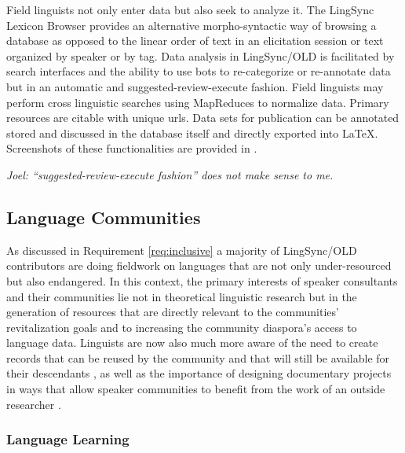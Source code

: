 \documentclass[11pt]{article}
\begin{document}
Field linguists not only enter data but also seek to analyze it. The LingSync
Lexicon Browser provides an alternative morpho-syntactic way of browsing a
database as opposed to the linear order of text in an elicitation session or
text organized by speaker or by tag. Data analysis in LingSync/OLD is
facilitated by search interfaces and the ability to use bots to re-categorize
or re-annotate data but in an automatic and suggested-review-execute fashion.
Field linguists may perform cross linguistic searches using MapReduces to
normalize data. Primary resources are citable with unique \glspl{url}. Data
sets for publication can be annotated stored and discussed in the database
itself and directly exported into LaTeX. Screenshots of these functionalities
are provided in \cite{lingsync:2012}.

\textit{Joel: ``suggested-review-execute fashion'' does not make sense to me.}

%
\subsection{Language Communities}

As discussed in Requirement \autoref{req:inclusive} a majority of LingSync/OLD contributors are doing fieldwork on languages that
are not only under-resourced but also endangered. In this context, the primary
interests of speaker consultants and their communities lie not in theoretical
linguistic research but in the generation of resources that are directly
relevant to the communities' revitalization goals and to increasing the community diaspora's
access to language data. Linguists are now also much more aware of the need to
create records that can be reused by the community and that will still be
available for their descendants \cite[p.129]{Thieberger:2012}, as well as the
importance of designing documentary projects in ways that allow speaker
communities to benefit from the work of an outside researcher \cite{Good:2012}.


\subsubsection{Language Learning}
\end{document}
